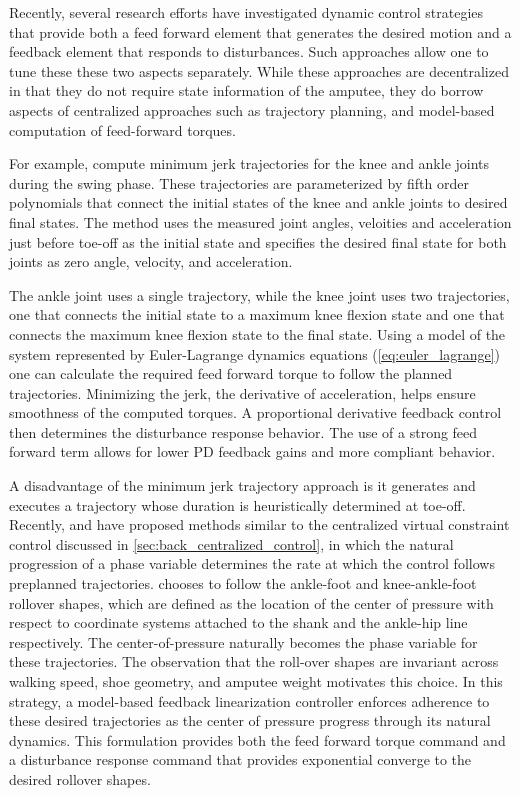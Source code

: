 Recently, several research efforts have investigated dynamic control strategies
that provide both a feed forward element that generates the desired motion and a
feedback element that responds to disturbances. Such approaches allow one to
tune these these two aspects separately. While these approaches are
decentralized in that they do not require state information of the amputee, they
do borrow aspects of centralized approaches such as trajectory planning, and
model-based computation of feed-forward torques.

For example, \citet{lenzi2014speed, lenzi2014minimum} compute minimum jerk
trajectories for the knee and ankle joints during the swing phase. These
trajectories are parameterized by fifth order polynomials that connect the
initial states of the knee and ankle joints to desired final states. The method
uses the measured joint angles, veloities and acceleration just before toe-off
as the initial state and specifies the desired final state for both joints as
zero angle, velocity, and acceleration.

The ankle joint uses a single trajectory, while the knee joint
uses two trajectories, one that connects the initial state to a maximum knee
flexion state and one that connects the maximum knee flexion state to the final
state.  Using a model of the system represented by Euler-Lagrange dynamics
equations (\cref{eq:euler_lagrange}) one can calculate the required feed forward
torque to follow the planned trajectories. Minimizing the jerk, the derivative
of acceleration, helps ensure smoothness of the computed torques. A proportional
derivative feedback control then determines the disturbance response behavior.
The use of a strong feed forward term allows for lower PD feedback gains and
more compliant behavior.

A disadvantage of the minimum jerk trajectory approach is it generates and
executes a trajectory whose duration is heuristically determined at toe-off.
Recently, \citet{gregg2014virtual} and \citet{zhao2016first} have proposed
methods similar to the centralized virtual constraint control discussed in
\cref{sec:back_centralized_control}, in which the natural progression of a phase
variable determines the rate at which the control follows preplanned
trajectories. \citet{gregg2014virtual} chooses to follow the ankle-foot and
knee-ankle-foot rollover shapes, which are defined as the location of the center
of pressure with respect to coordinate systems attached to the shank and the
ankle-hip line respectively. The center-of-pressure naturally becomes the phase
variable for these trajectories. The observation that the roll-over shapes are
invariant across walking speed, shoe geometry, and amputee weight motivates this
choice. In this strategy, a model-based feedback linearization controller
enforces adherence to these desired trajectories as the center of pressure
progress through its natural dynamics. This formulation provides both the feed
forward torque command and a disturbance response command that provides
exponential converge to the desired rollover shapes. 

